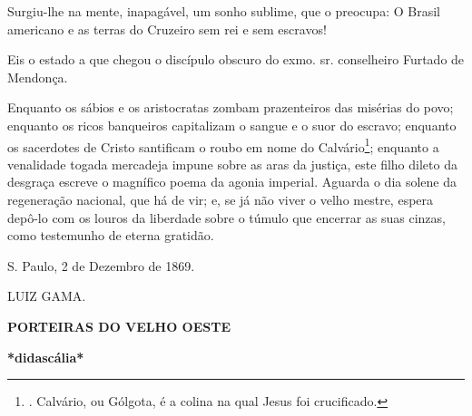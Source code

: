 Surgiu-lhe na mente, inapagável, um sonho sublime, que o preocupa: O
Brasil americano e as terras do Cruzeiro sem rei e sem escravos!

Eis o estado a que chegou o discípulo obscuro do exmo. sr. conselheiro
Furtado de Mendonça.

Enquanto os sábios e os aristocratas zombam prazenteiros das misérias do
povo; enquanto os ricos banqueiros capitalizam o sangue e o suor do
escravo; enquanto os sacerdotes de Cristo santificam o roubo em nome do
Calvário\footnote{. Calvário, ou Gólgota, é a colina na qual Jesus foi
  crucificado.}; enquanto a venalidade togada mercadeja impune sobre as
aras da justiça, este filho dileto da desgraça escreve o magnífico poema
da agonia imperial. Aguarda o dia solene da regeneração nacional, que há
de vir; e, se já não viver o velho mestre, espera depô-lo com os louros
da liberdade sobre o túmulo que encerrar as suas cinzas, como testemunho
de eterna gratidão.

S. Paulo, 2 de Dezembro de 1869.

LUIZ GAMA.

\textbf{PORTEIRAS DO VELHO OESTE}

\textbf{*didascália*}

